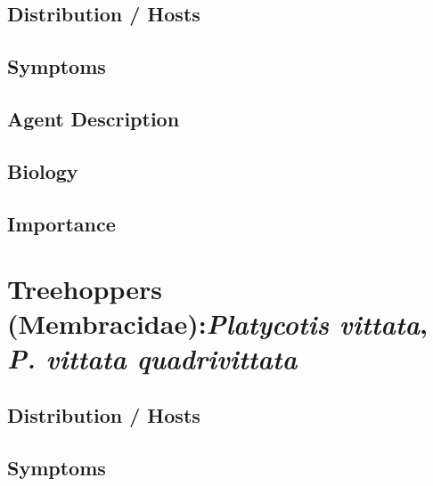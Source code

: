 \documentclass[
]{book}
\begin{document}
\subsection*{Distribution / Hosts}\label{distribution-hosts-14}

\subsection*{Symptoms}\label{symptoms-14}

\subsection*{Agent Description}\label{agent-description-14}

\subsection*{Biology}\label{biology-14}

\subsection*{Importance}\label{importance-14}

\section*{\texorpdfstring{Treehoppers (Membracidae):\emph{Platycotis vittata}, \emph{P. vittata quadrivittata}}{Treehoppers (Membracidae):Platycotis vittata, P. vittata quadrivittata}}\label{treehoppers-membracidaeplatycotis-vittata-p.-vittata-quadrivittata}

\subsection*{Distribution / Hosts}\label{distribution-hosts-15}

\subsection*{Symptoms}\label{symptoms-15}
\end{document}
